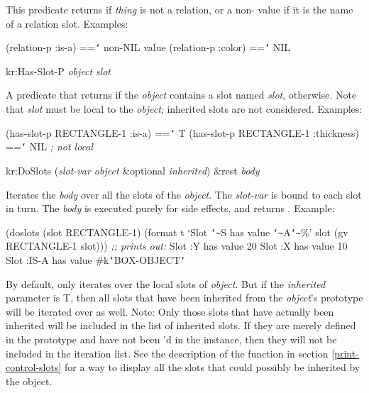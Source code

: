 This predicate returns \value{nil} if {\it thing} is not a
relation, or a non-\value{nil} value if it is the name of a relation slot.\newline{}
Examples:
\begin{programexample}
(relation-p :is-a) =={\tt\char`\>} non-NIL value
(relation-p :color) =={\tt\char`\>} NIL
\end{programexample}



\value{f-top}
\begin{example}
kr:Has-Slot-P {\it object} {\it slot}\value{function}
\end{example}

A predicate that returns \value{T} if the {\it object} contains a slot named
{\it slot}, \value{NIL} otherwise.  Note that {\it slot} must be local to the
{\it object}; inherited slots are not considered.\newline{}
Examples:
\begin{programexample}
(has-slot-p RECTANGLE-1 :is-a)  =={\tt\char`\>} T
(has-slot-p RECTANGLE-1 :thickness) =={\tt\char`\>} NIL   {\it ; not local}
\end{programexample}



\value{f-top}
\begin{example}
kr:DoSlots ({\it slot-var object} \&optional {\it inherited}) \&rest {\it body}\value{Macro}
\end{example}

Iterates the {\it body} over all the
slots of the {\it object}.  The {\it slot-var} is bound to each slot in turn.
The {\it body} is executed purely for side effects, and  returns
\value{NIL}.  Example:

\begin{programexample}
(doslots (slot RECTANGLE-1)
  (format t `Slot {\tt\char`\~}S has value {\tt\char`\~}A{\tt\char`\~}\%'
          slot (gv RECTANGLE-1 slot)))
{\it ;; prints out:}
Slot :Y has value 20
Slot :X has value 10
Slot :IS-A has value \#k{\tt\char`\<}BOX-OBJECT{\tt\char`\>}
\end{programexample}

By default,  only iterates over the local slots of {\it object}.
But if the {\it inherited} parameter is T, then all slots that have been
inherited from the {\it object}'s prototype will be iterated over as well.
Note: Only those slots that have actually been inherited will be included
in the list of inherited slots.  If they are merely defined in the prototype
and have not been 'd in the instance, then they will not be
included in the iteration list.  See the description of the function 
in section \ref{print-control-slots} for a way to display all the slots that
could possibly be inherited by the object.



